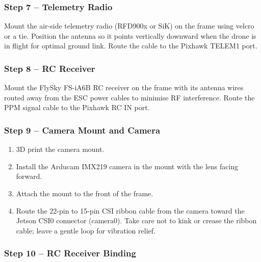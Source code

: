 \documentclass{article}
\begin{document}
\subsubsection{Step 7 -- Telemetry Radio}

Mount the air-side telemetry radio (RFD900x or SiK) on the frame using velcro or a tie. Position the antenna so it points vertically downward when the drone is in flight for optimal ground link. Route the cable to the Pixhawk TELEM1 port.

\subsubsection{Step 8 -- RC Receiver}

Mount the FlySky FS-iA6B RC receiver on the frame with its antenna wires routed away from the ESC power cables to minimise RF interference. Route the PPM signal cable to the Pixhawk RC IN port.

\subsubsection{Step 9 -- Camera Mount and Camera}

\begin{enumerate}
    \item 3D print the camera mount.
    \item Install the Arducam IMX219 camera in the mount with the lens facing forward.
    \item Attach the mount to the front of the frame.
    \item Route the 22-pin to 15-pin CSI ribbon cable from the camera toward the Jetson CSI0 connector (camera0). Take care not to kink or crease the ribbon cable; leave a gentle loop for vibration relief.
\end{enumerate}

\subsubsection{Step 10 -- RC Receiver Binding}
\end{document}
